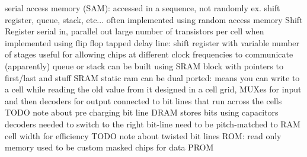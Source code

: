 \documentclass[12pt]{article}
\begin{document}
\begin{spacing}{0.8}
\begin{multicols*}{2}
\begin{flushleft}
\begin{outline}[longenum]
  \1 serial access memory (SAM): accessed in a sequence, not randomly
    \2 ex. shift register, queue, stack, etc...
    \2 often implemented using random access memory
  \1 Shift Register
    \2 serial in, parallel out
    \2 large number of transistors per cell when implemented using flip flop
    \2 tapped delay line: shift register with variable number of stages
      \3 useful for allowing chips at different clock frequencies to communicate (apparently)
  \1 queue or stack can be built using SRAM block with pointers to first/last and stuff
  \1 SRAM
    \2 static ram
    \2 can be dual ported: means you can write to a cell while reading the old value from it
    \2 designed in a cell grid, MUXes for input and then decoders for output connected to bit lines that run across the cells
    \2 TODO note about pre charging bit line
  \1 DRAM
    \2 stores bits using capacitors
  \1 decoders
    \2 needed to switch to the right bit-line
    \2 need to be pitch-matched to RAM cell width for efficiency
    \2 TODO note about twisted bit lines
  \1 ROM: read only memory
    \2 used to be custom masked chips for data
    \2 
  \1 PROM




\end{outline}
\end{flushleft}
\end{multicols*}
\end{spacing}
\end{document}

